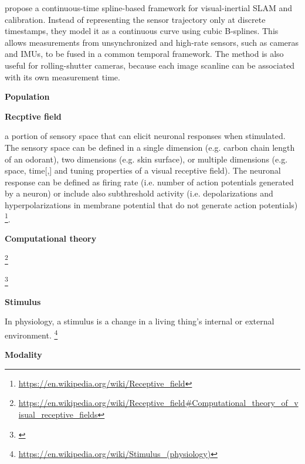 \documentclass{book}
\providecommand{\ProjectDeepHeading}[2]{%
    \par\medskip\noindent\textbf{#2}\par\smallskip
}
\providecommand{\seeherefooter}[1]{\footnote{\url{#1}}}
\begin{document}
    \cite{lovegrove-2013-spline-fusion-a-continuous-time-representation-for-visual-inertial-fusion-with-application-to-rolling-shutter-cameras} propose a continuous-time spline-based framework for visual-inertial SLAM and calibration. Instead of representing the sensor trajectory only at discrete timestamps, they model it as a continuous curve using cubic B-splines. This allows measurements from unsynchronized and high-rate sensors, such as cameras and IMUs, to be fused in a common temporal framework. The method is also useful for rolling-shutter cameras, because each image scanline can be associated with its own measurement time.

\ProjectDeepHeading{3}{Population}

\ProjectDeepHeading{4}{Recptive field}


a portion of sensory space that can elicit neuronal responses when stimulated. The sensory space can be defined in a single dimension (e.g. carbon chain length of an odorant), two dimensions (e.g. skin surface), or multiple dimensions (e.g. space, time[,] and tuning properties of a visual receptive field). The neuronal response can be defined as firing rate (i.e. number of action potentials generated by a neuron) or include also subthreshold activity (i.e. depolarizations and hyperpolarizations in membrane potential that do not generate action potentials) \seeherefooter{https://en.wikipedia.org/wiki/Receptive_field}.
    
    
    \ProjectDeepHeading{7}{Computational theory}
        \seeherefooter{https://en.wikipedia.org/wiki/Receptive_field\#Computational_theory_of_visual_receptive_fields}
        
        \seeherefooter{}

\ProjectDeepHeading{3}{Stimulus}


In physiology, a stimulus is a change in a living thing's internal or external environment.
   \seeherefooter{https://en.wikipedia.org/wiki/Stimulus_(physiology)}

\ProjectDeepHeading{4}{Modality}

\end{document}
